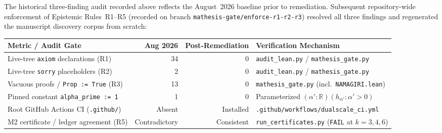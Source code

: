 The historical three-finding audit recorded above reflects the August~2026
baseline prior to remediation. Subsequent repository-wide enforcement of
Epistemic Rules~R1--R5 (recorded on branch
\texttt{mathesis-gate/enforce-r1-r2-r3}) resolved all three findings and
regenerated the manuscript discovery corpus from scratch:

\begin{center}
\begin{tabular}{lrrl}
\toprule
\textbf{Metric / Audit Gate} & \textbf{Aug 2026} & \textbf{Post-Remediation} & \textbf{Verification Mechanism} \\
\midrule
Live-tree \texttt{axiom} declarations (R1) & 34 & 0 & \texttt{audit\_lean.py} / \texttt{mathesis\_gate.py} \\
Live-tree \texttt{sorry} placeholders (R2) & 2 & 0 & \texttt{audit\_lean.py} / \texttt{mathesis\_gate.py} \\
Vacuous proofs / \texttt{Prop := True} (R3) & 13 & 0 & \texttt{mathesis\_gate.py} (incl.\ \texttt{NAMAGIRI.lean}) \\
Pinned constant \texttt{alpha\_prime := 1} & 1 & 0 & Parameterized $(\alpha' : \mathbb{R}) (h_{\alpha'} : \alpha' > 0)$ \\
Root GitHub Actions CI (\texttt{.github/}) & Absent & Installed & \texttt{.github/workflows/dualscale\_ci.yml} \\
M2 certificate / ledger agreement (R5) & Contradictory & Consistent & \texttt{run\_certificates.py} (\texttt{FAIL} at $k=3,4,6$) \\
\bottomrule
\end{tabular}
\end{center}


